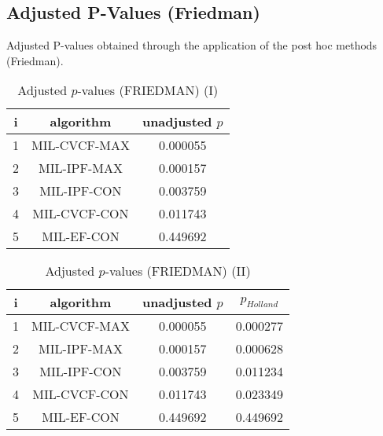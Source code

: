 \documentclass[a4paper,10pt]{article}
\begin{document}
\begin{landscape}
\newpage

\section{Adjusted P-Values (Friedman)}


Adjusted P-values obtained through the application of the post hoc methods (Friedman).

\begin{table}[!htp]
\centering\small
\begin{tabular}{ccc}
i&algorithm&unadjusted $p$\\
\hline1&MIL-CVCF-MAX&0.000055\\2&MIL-IPF-MAX&0.000157\\3&MIL-IPF-CON&0.003759\\4&MIL-CVCF-CON&0.011743\\5&MIL-EF-CON&0.449692\\\hline
\end{tabular}
\caption{Adjusted $p$-values (FRIEDMAN) (I)}
\end{table}
\begin{table}[!htp]
\centering\small
\begin{tabular}{cccc}
i&algorithm&unadjusted $p$&$p_{Holland}$\\
\hline1&MIL-CVCF-MAX&0.000055&0.000277\\2&MIL-IPF-MAX&0.000157&0.000628\\3&MIL-IPF-CON&0.003759&0.011234\\4&MIL-CVCF-CON&0.011743&0.023349\\5&MIL-EF-CON&0.449692&0.449692\\\hline
\end{tabular}
\caption{Adjusted $p$-values (FRIEDMAN) (II)}
\end{table}

\newpage
\end{landscape}
\end{document}
